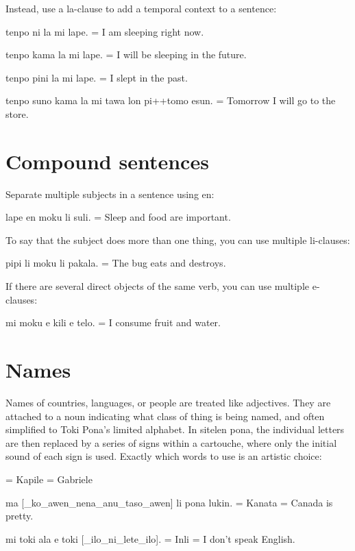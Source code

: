 \documentclass{article}
\begin{document}
\begin{multicols}{2}
Instead, use a {\tpf la}-clause to add a temporal context
to a sentence:
\begin{ex}
{\tpf tenpo ni la mi lape}. = I am sleeping right now.

{\tpf tenpo kama la mi lape}. = I will be sleeping in the future.

{\tpf tenpo pini la mi lape}. = I slept in the past.

{\tpf tenpo suno kama la mi tawa lon pi++tomo esun}. =
Tomorrow I will go to the store.
\end{ex}

\section*{Compound sentences}
Separate multiple subjects in a sentence using {\tpf en}:
\begin{ex}
  {\tpf lape en moku li suli}. = Sleep and food are important.
\end{ex}

To say that the subject does more than one thing,
you can use multiple {\tpf li}-clauses:
\begin{ex}
  {\tpf pipi li moku li pakala}. = The bug eats and destroys.
\end{ex}

If there are several direct objects of the same verb,
you can use multiple {\tpf e}-clauses:
\begin{ex}
  {\tpf mi moku e kili e telo}. = I consume fruit and water.
\end{ex}

\section*{Names}
Names of countries, languages, or people are
treated like adjectives. They are attached to a
noun indicating what class of thing is being named, and
often simplified to Toki Pona’s limited alphabet.
In sitelen pona, the individual letters are then replaced
by a series of signs within a cartouche, where only the
initial sound of each sign is used.  Exactly which words to use
is an artistic choice:
\begin{ex}
  {} = Kapile = Gabriele

  {\tpf ma [\_ko\_awen\_nena\_anu\_taso\_awen] li pona lukin}.
  = Kanata = Canada is pretty.

  {\tpf mi toki ala e toki [\_ilo\_ni\_lete\_ilo]}.
  = Inli = I don't speak English.


\end{ex}
\end{multicols}
\end{document}
